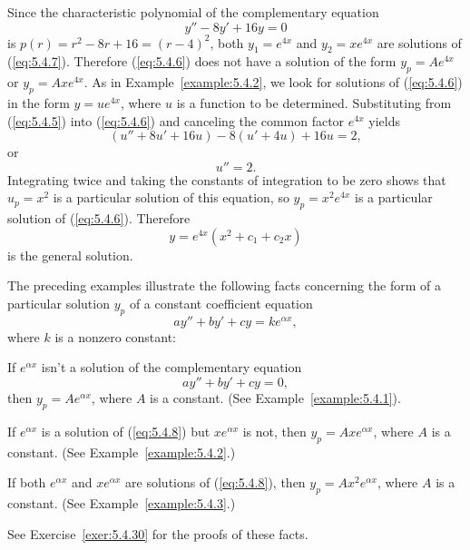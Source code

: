 \begin{examplesolution}
\solution Since the characteristic polynomial of the complementary equation
\begin{equation}
  \label{eq:5.4.7}y''-8y'+16y=0
\end{equation}
is $p(r)=r^{2}-8r+16=(r-4)^{2}$, both $y_{1}=e^{4x}$ and $y_{2}=xe^{4x}$ are solutions of
(\ref{eq:5.4.7}). Therefore (\ref{eq:5.4.6}) does not have a solution of the form $y_{p}=Ae^{4x}$ or
$y_{p}=Axe^{4x}$. As in Example~\ref{example:5.4.2}, we look for solutions of (\ref{eq:5.4.6}) in
the form $y=ue^{4x}$, where $u$ is a function to be determined. Substituting from (\ref{eq:5.4.5})
into (\ref{eq:5.4.6}) and canceling the common factor $e^{4x}$ yields
\[
  (u''+8u'+16u)-8(u'+4u)+16u=2,
\]
or
\[
  u''=2.
\]
Integrating twice and taking the constants of integration to be zero shows that $u_{p}=x^{2}$ is a
particular solution of this equation, so $y_{p}=x^{2}e^{4x}$ is a particular solution of
(\ref{eq:5.4.6}). Therefore
\[
  y=e^{4x}(x^{2}+c_{1}+c_{2}x)
\]
is the general solution. \bbox
\end{examplesolution}

The preceding examples illustrate the following facts concerning the form of a particular solution
$y_{p}$ of a constant coefficient equation
\[
  ay''+by'+cy=ke^{\alpha x},
\]
where $k$ is a nonzero constant:

\medskip

\begin{alist}
  \item %
  If $e^{\alpha x}$ isn't a solution of the complementary equation
  \begin{equation}
    \label{eq:5.4.8}ay''+by'+cy=0,
  \end{equation}
  then $y_{p}=Ae^{\alpha x}$, where $A$ is a constant. (See Example~\ref{example:5.4.1}).

  \item %
  If $e^{\alpha x}$ is a solution of (\ref{eq:5.4.8}) but $xe^{\alpha x}$ is not, then
  $y_{p}=Axe^{\alpha x}$, where $A$ is a constant. (See Example~\ref{example:5.4.2}.)

  \item %
  If both $e^{\alpha x}$ and $xe^{\alpha x}$ are solutions of (\ref{eq:5.4.8}), then
  $y_{p}=Ax^{2}e^{\alpha x}$, where $A$ is a constant. (See Example~\ref{example:5.4.3}.)
\end{alist}
See Exercise~\ref{exer:5.4.30} for the proofs of these facts.

